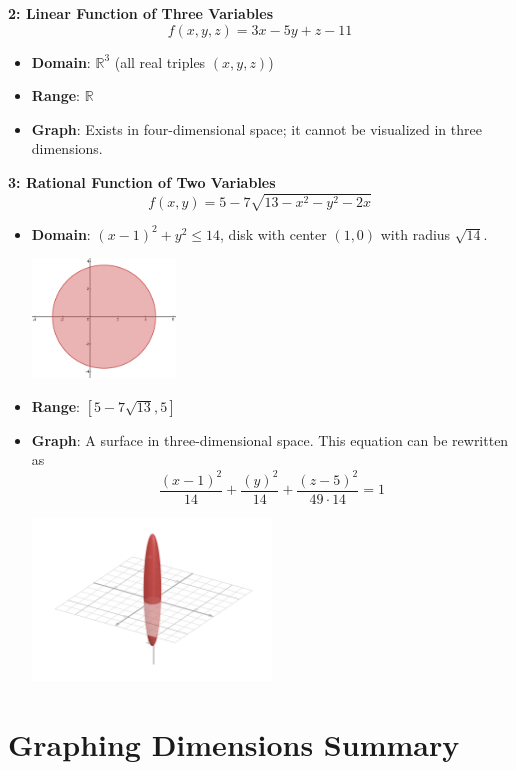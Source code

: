 \documentclass[a4paper,12pt,openany]{book}
\begin{document}
\textbf{2: Linear Function of Three Variables}
    \[
    f(x, y, z) = 3x - 5y + z - 11
    \]
    \begin{itemize}
        \item \textbf{Domain}: \(\mathbb{R}^3\) (all real triples \((x, y, z)\))
        \item \textbf{Range}: \(\mathbb{R}\)
        \item \textbf{Graph}: Exists in four-dimensional space; it cannot be visualized in three dimensions.
    \end{itemize}
\textbf{3: Rational Function of Two Variables}
    \[
        f(x, y) = 5 - 7 \sqrt{13-x^2-y^2-2x}
    \]
    \begin{itemize}
        \item \textbf{Domain}: $(x-1)^2+y^2 \leq 14$, disk with center $(1, 0)$ with radius $\sqrt{14}$.
        \begin{center}
            \includegraphics[width=0.3\textwidth]{domain1.png}
        \end{center}
        \item \textbf{Range}: $\left[5-7\sqrt{13}, 5\right]$
        \item \textbf{Graph}: A surface in three-dimensional space. This equation can be rewritten as 
        \[
            \frac{\left(x-1\right)^{2}}{14}+\frac{\left(y\right)^{2}}{14}+\frac{\left(z-5\right)^{2}}{49\cdot14}=1
        \] 
        \begin{center}
            \includegraphics[width=0.5\textwidth]{graph1.png}
        \end{center}
    \end{itemize}

\section{Graphing Dimensions Summary}
\end{document}
